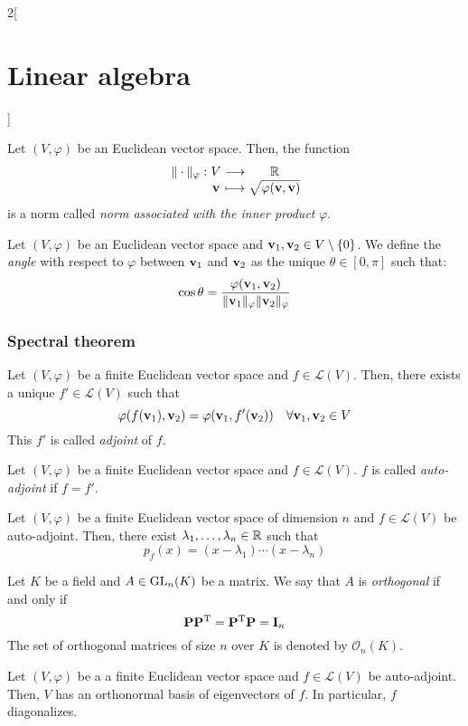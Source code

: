\documentclass[../../../main.tex]{subfiles}
\begin{document}
\begin{multicols}{2}[\section{Linear algebra}]
  \begin{proposition}
    Let $(V,\varphi)$ be an Euclidean vector space. Then, the function
    $$\function{\|\cdot\|_\varphi}{V}{\RR}{\vf{v}}{\sqrt{\varphi(\vf{v},\vf{v})}}$$
    is a norm called \emph{norm associated with the inner product} $\varphi$.
  \end{proposition}
  \begin{definition}
    Let $(V,\varphi)$ be an Euclidean vector space and $\boldsymbol{\mathrm{v}}_1,\boldsymbol{\mathrm{v}}_2\in V\setminus\{0\}$. We define the \emph{angle} with respect to $\varphi$ between $\boldsymbol{\mathrm{v}}_1$ and $\boldsymbol{\mathrm{v}}_2$ as the unique $\theta\in[0,\pi]$ such that: $$\cos{\theta}=\frac{\varphi(\boldsymbol{\mathrm{v}}_1,\boldsymbol{\mathrm{v}}_2)}{\|\boldsymbol{\mathrm{v}}_1\|_\varphi\|\boldsymbol{\mathrm{v}}_2\|_\varphi}$$
  \end{definition}
  \subsubsection{Spectral theorem}
  \begin{definition}
    Let $(V,\varphi)$ be a finite Euclidean vector space and $f\in\mathcal{L}(V)$. Then, there exists a unique $f'\in\mathcal{L}(V)$ such that $$\varphi(f(\boldsymbol{\mathrm{v}}_1),\boldsymbol{\mathrm{v}}_2)=\varphi(\boldsymbol{\mathrm{v}}_1,f'(\boldsymbol{\mathrm{v}}_2))\quad\forall \boldsymbol{\mathrm{v}}_1,\boldsymbol{\mathrm{v}}_2\in V$$ This $f'$ is called \emph{adjoint} of $f$.
  \end{definition}
  \begin{definition}
    Let $(V,\varphi)$ be a finite Euclidean vector space and $f\in\mathcal{L}(V)$. $f$ is called \emph{auto-adjoint} if $f=f'$.
  \end{definition}
  \begin{lemma}
    Let $(V,\varphi)$ be a finite Euclidean vector space of dimension $n$ and $f\in\mathcal{L}(V)$ be auto-adjoint. Then, there exist $\lambda_1,\ldots,\lambda_n\in\mathbb{R}$ such that $$p_f(x)=(x-\lambda_1 )\cdots(x-\lambda_n)$$
  \end{lemma}
  \begin{definition}
    Let $K$ be a field and $A\in\mathrm{GL}_n(K)$ be a matrix. We say that $A$ is \emph{orthogonal} if and only if $$\boldsymbol{\mathrm{P}}\vb{P}^{\mathrm{T}}=\vb{P}^{\mathrm{T}}\boldsymbol{\mathrm{P}}=\boldsymbol{\mathrm{I}}_n$$ The set of orthogonal matrices of size $n$ over $K$ is denoted by $\mathcal{O}_n(K)$.
  \end{definition}
  \begin{theorem}
    Let $(V,\varphi)$ be a a finite Euclidean vector space and $f\in\mathcal{L}(V)$ be auto-adjoint. Then, $V$ has an orthonormal basis of eigenvectors of $f$. In particular, $f$ diagonalizes.

\end{theorem}
\end{multicols}
\end{document}
